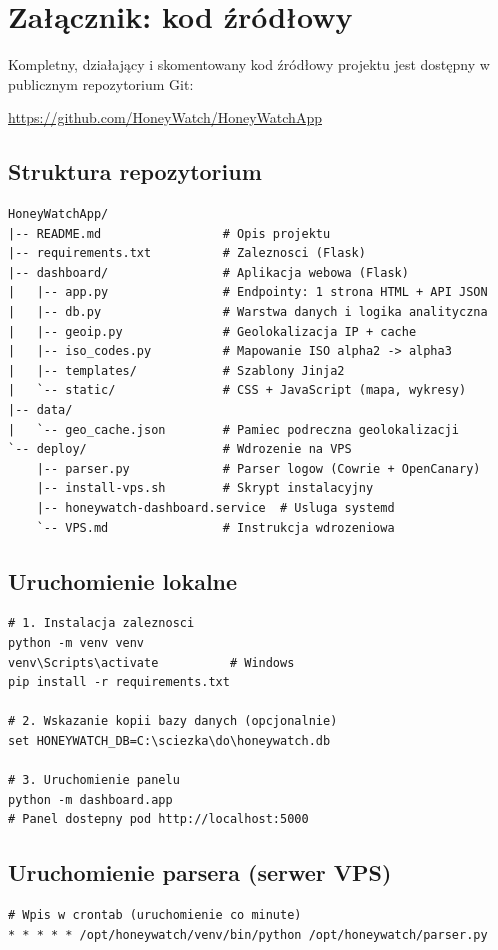 \documentclass[12pt,a4paper]{report}
\begin{document}
\appendix
\chapter{Załącznik: kod źródłowy}
\label{ch:appendix}

Kompletny, działający i skomentowany kod źródłowy projektu jest dostępny
w publicznym repozytorium Git:

\begin{center}
\large\url{https://github.com/HoneyWatch/HoneyWatchApp}
\end{center}

\section{Struktura repozytorium}

\begin{lstlisting}[caption={Struktura katalogów projektu.}]
HoneyWatchApp/
|-- README.md                 # Opis projektu
|-- requirements.txt          # Zaleznosci (Flask)
|-- dashboard/                # Aplikacja webowa (Flask)
|   |-- app.py                # Endpointy: 1 strona HTML + API JSON
|   |-- db.py                 # Warstwa danych i logika analityczna
|   |-- geoip.py              # Geolokalizacja IP + cache
|   |-- iso_codes.py          # Mapowanie ISO alpha2 -> alpha3
|   |-- templates/            # Szablony Jinja2
|   `-- static/               # CSS + JavaScript (mapa, wykresy)
|-- data/
|   `-- geo_cache.json        # Pamiec podreczna geolokalizacji
`-- deploy/                   # Wdrozenie na VPS
    |-- parser.py             # Parser logow (Cowrie + OpenCanary)
    |-- install-vps.sh        # Skrypt instalacyjny
    |-- honeywatch-dashboard.service  # Usluga systemd
    `-- VPS.md                # Instrukcja wdrozeniowa
\end{lstlisting}

\section{Uruchomienie lokalne}

\begin{lstlisting}[style=bashstyle,caption={Uruchomienie panelu w środowisku deweloperskim.}]
# 1. Instalacja zaleznosci
python -m venv venv
venv\Scripts\activate          # Windows
pip install -r requirements.txt

# 2. Wskazanie kopii bazy danych (opcjonalnie)
set HONEYWATCH_DB=C:\sciezka\do\honeywatch.db

# 3. Uruchomienie panelu
python -m dashboard.app
# Panel dostepny pod http://localhost:5000
\end{lstlisting}

\section{Uruchomienie parsera (serwer VPS)}

\begin{lstlisting}[style=bashstyle,caption={Cykliczne uruchamianie parsera przez cron.}]
# Wpis w crontab (uruchomienie co minute)
* * * * * /opt/honeywatch/venv/bin/python /opt/honeywatch/parser.py
\end{lstlisting}
\end{document}

